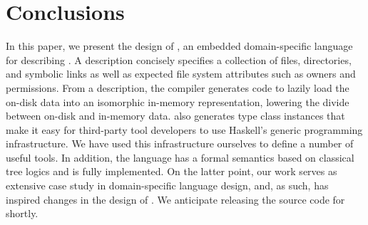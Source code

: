 \section{Conclusions}
\label{sec:conclusion}
In this paper, we present the design of \forest{}, an embedded
domain-specific language for describing \filestores{}.  A \forest{}
description concisely specifies a collection of files, directories,
and symbolic links as well as expected file system attributes such as
owners and permissions.  From a description, the \forest{} compiler
generates code to lazily load the on-disk data into an isomorphic
in-memory representation, lowering the divide between on-disk and
in-memory data.  
\forest{} also generates type class instances that make it 
easy for third-party tool developers to use
Haskell's generic programming infrastructure.  We have used this
infrastructure ourselves to define a number of useful tools. 
In addition, the language has a formal semantics based on classical tree logics and is
fully implemented.  On the latter point, our work 
serves as extensive case study in domain-specific
language design, and, as such, has inspired changes in the design of
\template{}.  We anticipate releasing the 
source code for \forest{} shortly.
